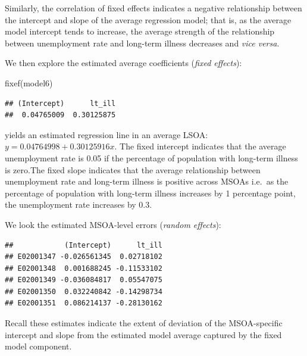 \documentclass[
]{book}
\newenvironment{Shaded}{\begin{snugshade}}{\end{snugshade}}
\newcommand{\DecValTok}[1]{\textcolor[rgb]{0.00,0.00,0.81}{#1}}
\newcommand{\FunctionTok}[1]{\textcolor[rgb]{0.00,0.00,0.00}{#1}}
\newcommand{\NormalTok}[1]{#1}
\newcommand{\OtherTok}[1]{\textcolor[rgb]{0.56,0.35,0.01}{#1}}
\newcommand{\SpecialCharTok}[1]{\textcolor[rgb]{0.00,0.00,0.00}{#1}}
\begin{document}
Similarly, the correlation of fixed effects indicates a negative relationship between the intercept and slope of the average regression model; that is, as the average model intercept tends to increase, the average strength of the relationship between unemployment rate and long-term illness decreases and \emph{vice versa}.

We then explore the estimated average coefficients (\emph{fixed effects}):

\begin{Shaded}
\begin{Highlighting}[]
\FunctionTok{fixef}\NormalTok{(model6)}
\end{Highlighting}
\end{Shaded}

\begin{verbatim}
## (Intercept)      lt_ill 
##  0.04765009  0.30125875
\end{verbatim}

yields an estimated regression line in an average LSOA: \(y = 0.04764998 + 0.30125916x\). The fixed intercept indicates that the average unemployment rate is 0.05 if the percentage of population with long-term illness is zero.The fixed slope indicates that the average relationship between unemployment rate and long-term illness is positive across MSOAs i.e.~as the percentage of population with long-term illness increases by 1 percentage point, the unemployment rate increases by 0.3.

We look the estimated MSOA-level errors (\emph{random effects}):

\begin{Shaded}
\end{Shaded}

\begin{verbatim}
##            (Intercept)      lt_ill
## E02001347 -0.026561345  0.02718102
## E02001348  0.001688245 -0.11533102
## E02001349 -0.036084817  0.05547075
## E02001350  0.032240842 -0.14298734
## E02001351  0.086214137 -0.28130162
\end{verbatim}

Recall these estimates indicate the extent of deviation of the MSOA-specific intercept and slope from the estimated model average captured by the fixed model component.
\end{document}
